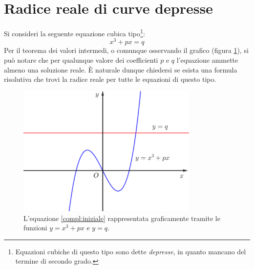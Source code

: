 %
%
%
%


\section{Radice reale di curve depresse}
\label{compl:cubidepresse}
Si consideri la seguente equazione cubica tipo\footnote{Equazioni cubiche di questo tipo sono dette \emph{depresse}, in quanto mancano del termine di secondo grado.}:
\begin{equation}
	\label{compl:iniziale}
	x^3+px=q
\end{equation}
Per il teorema dei valori intermedi, o comunque osservando il grafico (figura \ref{compl:cubica}), si può notare che per qualunque valore dei coefficienti $p$ e $q$ l'equazione ammette almeno una soluzione reale. È naturale dunque chiedersi se esista una formula risolutiva che trovi la radice reale per tutte le equazioni di questo tipo.

\begin{figure}[ht]
	\centering
	\includegraphics[width=0.8\textwidth]{grafici/cubica}
	\caption{L'equazione \ref{compl:iniziale} rappresentata graficamente tramite le funzioni $y=x^3+px$ e $y=q$.}
	\label{compl:cubica}
\end{figure}

